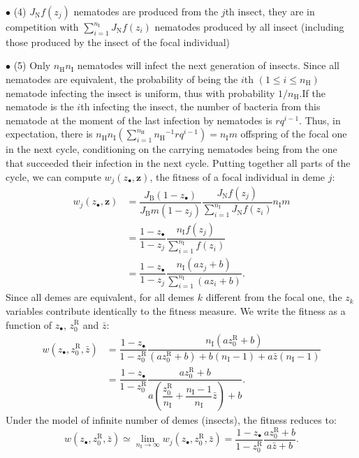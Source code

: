 \documentclass{article}
\newcommand{\nN}{{n_\textrm{H}}}
\newcommand{\nI}{{n_\textrm{I}}}
\begin{document}
 
 $\bullet$ (4) $J_{\mathrm{N}} f(z_j)$ nematodes are produced from the $j$th insect, they are in competition with $\sum_{i=1}^{\nI} J_\mathrm{N} f(z_i)$ nematodes produced by all insect (including those produced by the insect of the focal individual)
 
 
 $\bullet$ (5) Only $\nN \nI$ nematodes will infect the next generation of insects. Since all nematodes are equivalent, the probability of being the $i$th $(1 \leq i \leq \nN)$ nematode infecting the insect 
is uniform, thus with probability $1/\nN$.If the nematode is the $i$th infecting the insect, the number of bacteria from this nematode at the moment of the last infection by nematodes is $r q^{i-1}$.
Thus, in expectation, there is $\nN \nI (\sum_{i=1}^\nN \nN^{-1}  r q^{i-1})=\nI m$ offspring of the focal one in the next cycle, conditioning on the carrying nematodes being from the one that succeeded their infection in the next cycle. 
Putting together all parts of the cycle, we can compute $ w_j(z_\bullet , \mathbf{z} )$, the fitness of a focal individual in deme $j$:
 \begin{align}
 w_j(z_\bullet , \mathbf{z} ) &= \dfrac{J_{\mathrm{B}}(1-z_\bullet)}{J_{\mathrm{B}} m (1- z_j)}\dfrac{ J_\mathrm{N} f(z_j)}{\sum_{i=1}^{\nI} J_\mathrm{N}  f(z_i)} \nI m \\
 &= \dfrac{1-z_\bullet}{1- z_j}\dfrac{\nI f(z_j)}{\sum_{i=1}^{\nI} f(z_i)} \\
  &= \dfrac{1-z_\bullet}{1- z_j}\dfrac{\nI (a z_j +b) }{\sum_{i=1}^{\nI} (a z_i +b)}.
 \end{align} 
 Since all demes are equivalent, for all demes $k$ different from the focal one, the $z_k$ variables contribute identically to the fitness measure. We write the fitness as a function of $z_\bullet$, $z_0^{\mathrm{R}}$ and $\bar{z}$:
  \begin{align}
 w(z_\bullet ,z_0^{\mathrm{R}} , \bar{z} ) &= \dfrac{1-z_\bullet}{1- z_0^{\mathrm{R}}}\dfrac{\nI (a z_0^{\mathrm{R}} +b) }{(a z_0^{\mathrm{R}} +b)+ b(\nI -1) +a \bar{z} (\nI-1)} \\
 &= \dfrac{1-z_\bullet}{1- z_0^{\mathrm{R}}}\dfrac{ a z_0^{\mathrm{R}} +b }{a \left( \dfrac{z_0^{\mathrm{R}}}{\nI} +\dfrac{\nI-1}{\nI} \bar{z} \right) +b}.
  \end{align}
  Under the model of infinite number of demes (insects), the fitness reduces to:
  \begin{equation}
  w(z_\bullet ,z_0^{\mathrm{R}} , \bar{z} ) \simeq \lim_{\nI \rightarrow \infty} w_j(z_\bullet ,z_0^{\mathrm{R}} , \bar{z} ) = \dfrac{1-z_\bullet}{1- z_0^{\mathrm{R}}}\dfrac{a z_0^{\mathrm{R}} +b }{a \bar{z} +b}.
  \end{equation}
\end{document}
